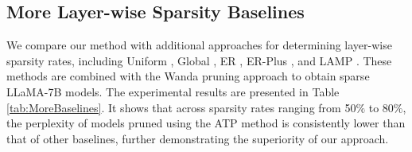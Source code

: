 \subsection{More Layer-wise Sparsity Baselines}\label{sec:more_baselines}
We compare our method with additional approaches for determining layer-wise sparsity rates, including Uniform \citep{zhu2017prune}, Global \citep{frankle2018lottery}, ER \citep{mocanu2018scalable}, ER-Plus \citep{liu2022unreasonable}, and LAMP \citep{lee2020layer}. These methods are combined with the Wanda pruning approach to obtain sparse LLaMA-7B models. The experimental results are presented in Table \ref{tab:MoreBaselines}. It shows that across sparsity rates ranging from 50$\%$ to 80$\%$, the perplexity of models pruned using the ATP method is consistently lower than that of other baselines, further demonstrating the superiority of our approach.
\begin{table}[h!]
    \centering
    \caption{Comparison of WikiText-2 perplexity across various sparsity rates and methods.}\label{tab:MoreBaselines}
\end{table}

